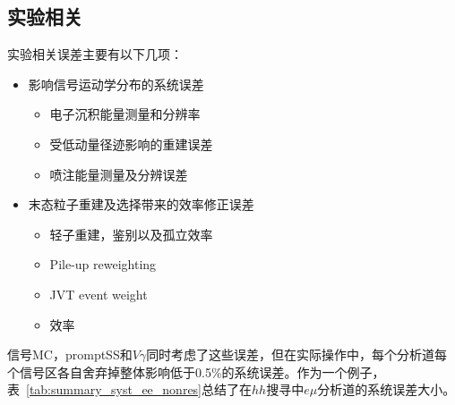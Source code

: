 \subsection{实验相关}
实验相关误差主要有以下几项：
\begin{itemize}
  \item 影响信号运动学分布的系统误差
   \begin{itemize}
     \item 电子沉积能量测量和分辨率
     \item 受低动量径迹影响的\met 重建误差
     \item 喷注能量测量及分辨误差
   \end{itemize}
   \item 末态粒子重建及选择带来的效率修正误差
    \begin{itemize}
      \item 轻子重建，鉴别以及孤立效率
      \item Pile-up reweighting
      \item JVT event weight
      \item \btag 效率
    \end{itemize}
\end{itemize}
信号MC，promptSS和$V\gamma$同时考虑了这些误差，但在实际操作中，每个分析道每个信号区各自舍弃掉整体影响低于0.5\%的系统误差。作为一个例子，表~\ref{tab:summary_syst_ee_nonres}总结了在$hh$搜寻中$e\mu$分析道的系统误差大小。
